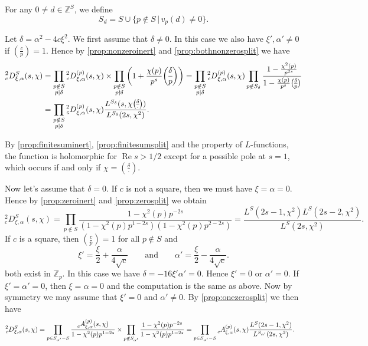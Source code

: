\documentclass[10pt,oneside,reqno]{amsart}
\newcommand\ZZ{\mathbb{Z}}
\renewcommand\Re{\mathop{\mathrm{Re}}}
\newcommand\legendresymbol[2]{\genfrac{(}{)}{}{}{#1}{#2}}
\theoremstyle{THEOREM}
\theoremstyle{DEFINITION}
\theoremstyle{EXERCISE}
\numberwithin{equation}{section}
\begin{document}
For any $0\neq d\in \ZZ^S$, we define
\begin{equation}\label{eq:defsxi}
S_d=S\cup\{p\notin S\,|\, v_p(d)\neq 0\}.
\end{equation}

Let $\delta=\alpha^2-4c\xi^2$. We first assume that $\delta\neq 0$. In this case we also have $\xi',\alpha'\neq 0$ if $\legendresymbol{c}{p}=1$. Hence by \autoref{prop:nonzeroinert} and \autoref{prop:bothnonzerosplit} we have
\begin{align*}
{}^2_cD^S_{\xi,\alpha}(s,\chi)&=\prod_{\substack{p\notin S\\p\mid\delta}}\prescript{2}{c}D_{\xi,\alpha}^{(p)}(s,\chi)\times\prod_{\substack{p\notin S\\p\nmid\delta}} \left(1+\frac{\chi(p)}{p^{s}}\legendresymbol{\delta}{p}\right)
=\prod_{\substack{p\notin S\\p\mid\delta}}\prescript{2}{c}D_{\xi,\alpha}^{(p)}(s,\chi)\prod_{p\notin S_\delta}\frac{1-\frac{\chi^2(p)}{p^{2s}}}{1-\frac{\chi(p)}{p^{s}}\legendresymbol {\delta}{p}}\\
&=\prod_{\substack{p\notin S\\p\mid\delta}}\prescript{2}{c}D_{\xi,\alpha}^{(p)}(s,\chi) \frac{L^{S_\delta}(s,\chi \legendresymbol{\delta}{\cdot})}{L^{S_\delta}(2s,\chi^2)}.
\end{align*}

By \autoref{prop:finitesuminert}, \autoref{prop:finitesumsplit} and the property of $L$-functions,
the function is holomorphic for $\Re s>1/2$ except for a possible pole at $s=1$, which occurs if and only if $\chi=\legendresymbol{\delta}{\cdot}$.

Now let's assume that $\delta=0$. If $c$ is not a square, then we must have $\xi=\alpha=0$. Hence by \autoref{prop:zeroinert} and \autoref{prop:zerosplit} we obtain
\[
{}^2_cD^S_{\xi,\alpha}(s,\chi)=\prod_{p\notin S}\frac{1-\chi^2(p)p^{-2s}}{(1-\chi^2(p)p^{1-2s}) (1-\chi^2(p)p^{2-2s})}=\frac{L^S(2s-1,\chi^2)L^S(2s-2,\chi^2)}{L^S(2s,\chi^2)}.
\]
If $c$ is a square, then $\legendresymbol{c}{p}=1$ for all $p\notin S$ and
\begin{equation}\label{eq:defxiprime}
\xi'=\frac{\xi}{2}+\frac{\alpha}{4\sqrt{c}}\qquad\text{and}\qquad \alpha'=\frac{\xi}{2}-\frac{\alpha}{4\sqrt{c}}.
\end{equation}
both exist in $\ZZ_p$. In this case we have $\delta=-16\xi'\alpha'=0$. Hence $\xi'=0$ or $\alpha'=0$. If $\xi'=\alpha'=0$, then $\xi=\alpha=0$ and the computation is the same as above. Now by symmetry we may assume that $\xi'=0$ and $\alpha'\neq 0$. By \autoref{prop:onezerosplit} we then have
\begin{align*}
\prescript{2}{c}D^S_{\xi,\alpha}(s,\chi)&=\prod_{p\in S_{\alpha'}-S}\frac{\prescript{}{c}{A}_{\xi,\alpha}^{(p)}(s,\chi)}{1-\chi^2(p)p^{1-2s}}\times \prod_{p\notin S_{\alpha'}}\frac{1-\chi^2(p)p^{-2s}}{1-\chi^2(p)p^{1-2s}}=\prod_{p\in S_{\alpha'}-S}\prescript{}{c}{A}_{\xi,\alpha}^{(p)}(s,\chi)\frac{L^{S}(2s-1,\chi^2)}{L^{S_{\alpha'}}(2s,\chi^2)}.
\end{align*}
\end{document}
